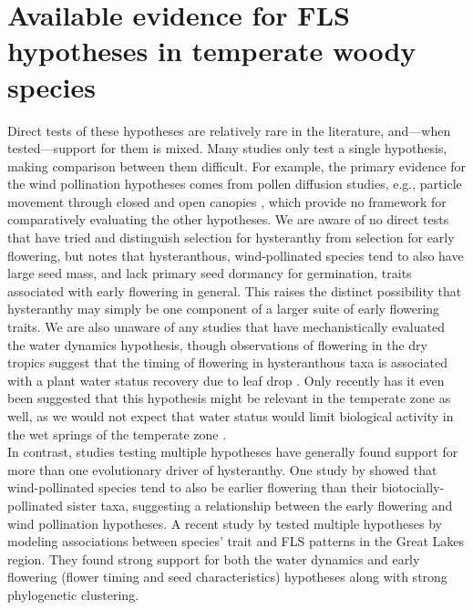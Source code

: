\documentclass[12pt]{article}\usepackage[]{graphicx}\usepackage[]{color}
\begin{document}
\section*{Available evidence for FLS hypotheses in temperate woody species} 
\indent\indent Direct tests of these hypotheses are relatively rare in the literature, and---when tested---support for them is mixed. Many studies only test a single hypothesis, making comparison between them difficult. For example, the primary evidence for the wind pollination hypotheses comes from pollen diffusion studies, e.g., particle movement through closed and open canopies \citep{Niklas1985,Nathan2005, Milleron2012}, which provide no framework for comparatively evaluating the other hypotheses. We are aware of no direct tests that have tried and distinguish selection for hysteranthy from selection for early flowering, but \citet{Primack1987} notes that hysteranthous, wind-pollinated species tend to also have large seed mass, and lack primary seed dormancy for germination, traits associated with early flowering in general. This raises the distinct possibility that hysteranthy may simply be one component of a larger suite of early flowering traits. We are also unaware of any studies that have mechanistically evaluated the water dynamics hypothesis, though observations of flowering in the dry tropics suggest that the timing of flowering in hysteranthous taxa is associated with a plant water status recovery due to leaf drop \citep{Borchert1983,Reich1984}. Only recently has it even been suggested that this hypothesis might be relevant in the temperate zone as well, as we would not expect that water status would limit biological activity in the wet springs of the temperate zone \citep{Gougherty2018}.\\

\indent In contrast, studies testing multiple hypotheses have generally found support for more than one evolutionary driver of hysteranthy. One study by \citet{Bolmgren2003} showed that wind-pollinated species tend to also be earlier flowering than their biotocially-pollinated sister taxa, suggesting a relationship between the early flowering and wind pollination hypotheses. A recent study by \citet{Gougherty2018} tested multiple hypotheses by modeling associations between species' trait and FLS patterns in the Great Lakes region. They found strong support for both the water dynamics and early flowering (flower timing and seed characteristics) hypotheses along with strong phylogenetic clustering. \\
\end{document}
